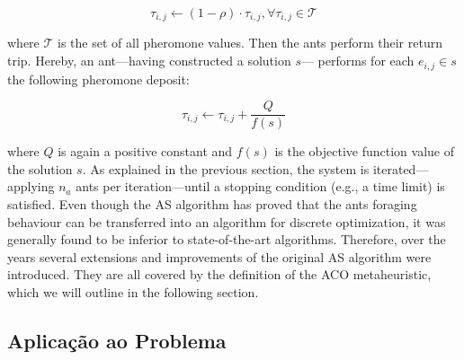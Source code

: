 \begin{equation}
  \tau_{i,j} \leftarrow (1-\rho)\cdot \tau_{i,j}, \forall \tau_{i,j}\in \mathcal{T}
\end{equation}

where $\mathcal{T }$ is the set of all pheromone values. Then the ants perform
their return trip. Hereby, an ant—having constructed a solution $s$— performs
for each $e_{i,j} \in s$ the following pheromone deposit:

\begin{equation}
  \tau_{i,j} \leftarrow \tau_{i,j} + \frac{Q}{f(s)}
\end{equation}

where $Q$ is again a positive constant and $f(s)$ is the objective function
value of the solution $s$. As explained in the previous section, the system
is iterated—applying $n_a$ ants per iteration—until a stopping condition
(e.g., a time limit) is satisfied.
Even though the AS algorithm has proved that the ants foraging behaviour
can be transferred into an algorithm for discrete optimization, it was 
generally found to be inferior to state-of-the-art algorithms. Therefore, 
over the years several extensions and improvements of the original AS
algorithm were introduced. They are all covered by the definition of the
ACO metaheuristic, which we will outline in the following section.

\subsection{Aplicação ao Problema}
